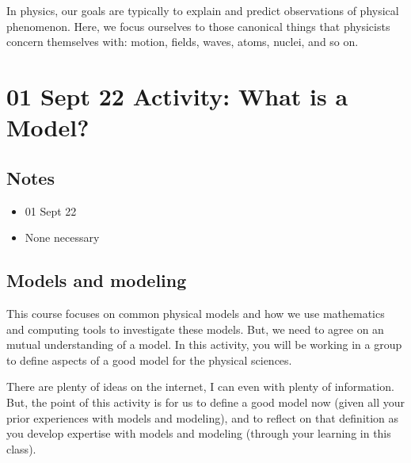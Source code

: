 \documentclass[letterpaper,10pt,english]{jupyterBook}
\begin{document}
\sphinxAtStartPar
In physics, our goals are typically to explain and predict observations of physical phenomenon. Here, we focus ourselves to those canonical things that physicists concern themselves with: motion, fields, waves, atoms, nuclei, and so on.

\sphinxstepscope


\chapter{01 Sept 22 \sphinxhyphen{} Activity: What is a Model?}
\label{\detokenize{content/1_mechanics/modeling/activity-what_is_a_model:sept-22-activity-what-is-a-model}}\label{\detokenize{content/1_mechanics/modeling/activity-what_is_a_model::doc}}

\section{Notes}
\label{\detokenize{content/1_mechanics/modeling/activity-what_is_a_model:notes}}\begin{itemize}
\item {} 
\sphinxAtStartPar
{} 01 Sept 22

\item {} 
\sphinxAtStartPar
{} None necessary

\end{itemize}


\section{Models and modeling}
\label{\detokenize{content/1_mechanics/modeling/activity-what_is_a_model:models-and-modeling}}
\sphinxAtStartPar
This course focuses on common physical models and how we use mathematics and computing tools to investigate these models. But, we need to agree on an mutual understanding of a model. In this activity, you will be working in a group to define aspects of a good model for the physical sciences.

\sphinxAtStartPar
There are plenty of ideas on the internet, I can even  with plenty of information. But, the point of this activity is for us to define a good model now (given all your prior experiences with models and modeling), and to reflect on that definition as you develop expertise with models and modeling (through your learning in this class).
\end{document}
